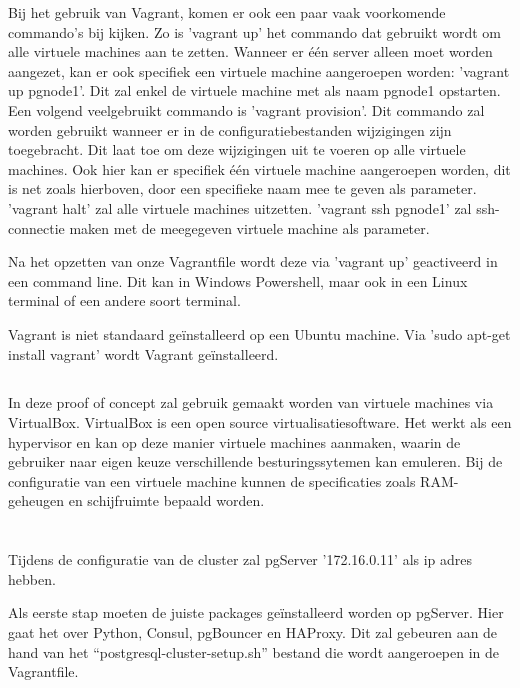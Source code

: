 Bij het gebruik van Vagrant, komen er ook een paar vaak voorkomende commando's bij kijken. Zo is 'vagrant up' het commando dat gebruikt wordt om alle virtuele machines aan te zetten. Wanneer er één server alleen moet worden aangezet, kan er ook specifiek een virtuele machine aangeroepen worden: 'vagrant up pgnode1'. Dit zal enkel de virtuele machine met als naam pgnode1 opstarten. Een volgend veelgebruikt commando is 'vagrant provision'. Dit commando zal worden gebruikt wanneer er in de configuratiebestanden wijzigingen zijn toegebracht. Dit laat toe om deze wijzigingen uit te voeren op alle virtuele machines. Ook hier kan er specifiek één virtuele machine aangeroepen worden, dit is net zoals hierboven, door een specifieke naam mee te geven als parameter. 'vagrant halt' zal alle virtuele machines uitzetten. 'vagrant ssh pgnode1' zal ssh-connectie maken met de meegegeven virtuele machine als parameter.

Na het opzetten van onze Vagrantfile wordt deze via 'vagrant up' geactiveerd in een command line. Dit kan in Windows Powershell, maar ook in een Linux terminal of een andere soort terminal.

Vagrant is niet standaard geïnstalleerd op een Ubuntu machine. Via 'sudo apt-get install vagrant' wordt Vagrant geïnstalleerd.

\subsection{}
\label{subsec:VirtualBox}
In deze proof of concept zal gebruik gemaakt worden van virtuele machines via VirtualBox. VirtualBox is een open source virtualisatiesoftware. Het werkt als een hypervisor en kan op deze manier virtuele machines aanmaken, waarin de gebruiker naar eigen keuze verschillende besturingssytemen kan emuleren. Bij de configuratie van een virtuele machine kunnen de specificaties zoals RAM-geheugen en schijfruimte bepaald worden.



\section{}
\label{sec:pgServer}
Tijdens de configuratie van de cluster zal pgServer '172.16.0.11' als ip adres hebben.

Als eerste stap moeten de juiste packages geïnstalleerd worden op pgServer. Hier gaat het over Python, Consul, pgBouncer en HAProxy. Dit zal gebeuren aan de hand van het “postgresql-cluster-setup.sh” bestand die wordt aangeroepen in de Vagrantfile.

